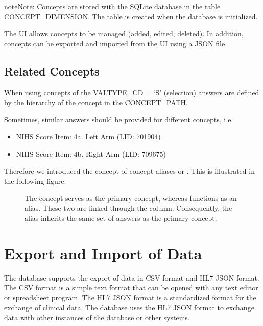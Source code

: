 \documentclass[a4paper,10pt,english]{sphinxmanual}
\begin{document}
\begin{sphinxadmonition}{note}{Note:}
\sphinxAtStartPar
Concepts are stored with the SQLite database in the table CONCEPT\_DIMENSION. The table is created when the database is initialized.

\sphinxAtStartPar
The UI allows concepts to be managed (added, edited, deleted). In addition, concepts can be exported and imported from the UI using a JSON file.
\end{sphinxadmonition}


\subsection{Related Concepts}
\label{\detokenize{TechnicalDetails:related-concepts}}
\sphinxAtStartPar
When using concepts of the VALTYPE\_CD = ‘S’ (selection) answers are defined by the hierarchy of the concept in the CONCEPT\_PATH.

\sphinxAtStartPar
Sometimes, similar answers should be provided for different concepts, i.e.
\begin{itemize}
\item {} 
\sphinxAtStartPar
NIHS Score Item: 4a. Left Arm (LID: 70190\sphinxhyphen{}4)

\item {} 
\sphinxAtStartPar
NIHS Score Item: 4b. Right Arm (LID: 70967\sphinxhyphen{}5)

\end{itemize}

\sphinxAtStartPar
Therefore we introduced the concept of concept aliases or . This is illustrated in the following figure.

\begin{figure}[htbp]
\centering
\capstart

\noindent{}
\caption{The concept  serves as the primary concept, whereas  functions as an alias. These two are linked through the  column. Consequently, the alias inherits the same set of answers as the primary concept.}\label{\detokenize{TechnicalDetails:id10}}\end{figure}


\section{Export and Import of Data}
\label{\detokenize{TechnicalDetails:export-and-import-of-data}}
\sphinxAtStartPar
The database supports the export of data in CSV format and HL7 JSON format. The CSV format is a simple text format that can be opened with any text editor or spreadsheet program. The HL7 JSON format is a standardized format for the exchange of clinical data. The database uses the HL7 JSON format to exchange data with other instances of the database or other systems.
\end{document}
